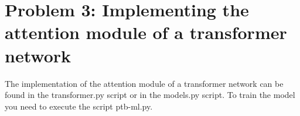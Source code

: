\section{Problem 3: Implementing the attention module of a transformer network}

The implementation of the attention module of a transformer network can be found in the transformer.py script or in the models.py script. To train the model you need to execute the script ptb-ml.py.
